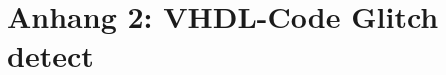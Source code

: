 \chapter{Anhang 2: VHDL-Code Glitch detect }\label{chap.anhang_2.vhdl_glitch}
%
%
%
%
%
%
%
%
%
%
%
%
%
%
%
%
%		
%
%	
%
%	
